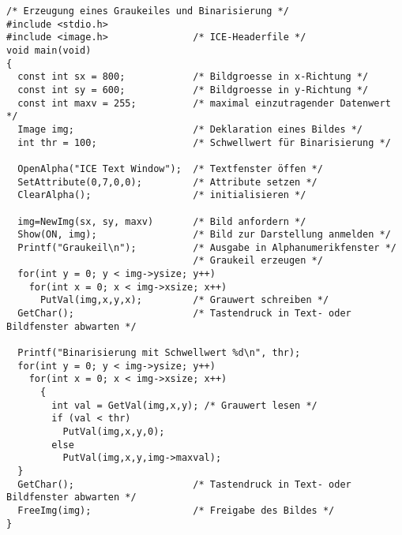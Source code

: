 \begprogr
\begin{verbatim}
/* Erzeugung eines Graukeiles und Binarisierung */
#include <stdio.h>
#include <image.h>               /* ICE-Headerfile */
void main(void)
{
  const int sx = 800;            /* Bildgroesse in x-Richtung */
  const int sy = 600;            /* Bildgroesse in y-Richtung */
  const int maxv = 255;          /* maximal einzutragender Datenwert */
  Image img;                     /* Deklaration eines Bildes */
  int thr = 100;                 /* Schwellwert für Binarisierung */

  OpenAlpha("ICE Text Window");  /* Textfenster öffen */
  SetAttribute(0,7,0,0);         /* Attribute setzen */
  ClearAlpha();                  /* initialisieren */

  img=NewImg(sx, sy, maxv)       /* Bild anfordern */
  Show(ON, img);                 /* Bild zur Darstellung anmelden */
  Printf("Graukeil\n");          /* Ausgabe in Alphanumerikfenster */
                                 /* Graukeil erzeugen */
  for(int y = 0; y < img->ysize; y++)
    for(int x = 0; x < img->xsize; x++)
      PutVal(img,x,y,x);         /* Grauwert schreiben */
  GetChar();                     /* Tastendruck in Text- oder Bildfenster abwarten */

  Printf("Binarisierung mit Schwellwert %d\n", thr);
  for(int y = 0; y < img->ysize; y++)
    for(int x = 0; x < img->xsize; x++)
      {
        int val = GetVal(img,x,y); /* Grauwert lesen */
        if (val < thr) 
          PutVal(img,x,y,0);
        else 
          PutVal(img,x,y,img->maxval);
  }
  GetChar();                     /* Tastendruck in Text- oder Bildfenster abwarten */
  FreeImg(img);                  /* Freigabe des Bildes */ 
}
\end{verbatim}
\endprogr

